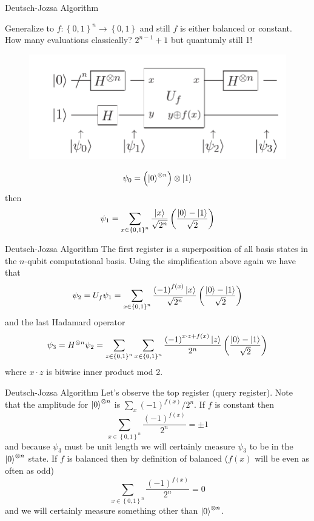 \documentclass{beamer}
\begin{document}
\begin{frame}{Deutsch-Jozsa Algorithm}

Generalize to $f:\left\{ 0,1\right\} ^{n}\to\left\{ 0,1\right\} $ and still $f$ is either balanced or constant.
How many evaluations classically? $2^{n-1}+1$ but quantumly still 1!
 
\begin{figure}[ht]
  \includegraphics[scale=0.33]{pasted2}
\end{figure}

\[
\psi_{0}=\left(\Ket{0}^{\otimes n}\right)\otimes\Ket{1}
\]
 then 
\[
\psi_{1}=\sum_{x\in\left\{ 0,1\right\} ^{n}}\frac{\Ket{x}}{\sqrt{2^{n}}}\left(\frac{\Ket{0}-\Ket{1}}{\sqrt{2}}\right)
\]

\end{frame}

\begin{frame}{Deutsch-Jozsa Algorithm}
The first register is a superposition of all basis states in the $n$-qubit
computational basis. Using the simplification above again we have
that 
\[
\psi_{2}=U_{f}\psi_{1}=\sum_{x\in\left\{ 0,1\right\} ^{n}}\frac{\left(-1\right)^{f\left(x\right)}\Ket{x}}{\sqrt{2^{n}}}\left(\frac{\Ket{0}-\Ket{1}}{\sqrt{2}}\right)
\]
and the last Hadamard operator 
\[
\psi_{3}=H^{\otimes n}\psi_{2}=\sum_{z\in\left\{ 0,1\right\} ^{n}}\sum_{x\in\left\{ 0,1\right\} ^{n}}\frac{\left(-1\right)^{x\cdot z+f\left(x\right)}\Ket{z}}{2^{n}}\left(\frac{\Ket{0}-\Ket{1}}{\sqrt{2}}\right)
\]
where $x\cdot z$ is bitwise inner product mod 2.  
\end{frame}

\begin{frame}{Deutsch-Jozsa Algorithm}
Let's observe the
top register (query register). Note that the amplitude for $\Ket{0}^{\otimes n}$
is $\sum_{x}\left(-1\right)^{f\left(x\right)}/2^{n}$. If $f$ is
constant then
\[
\sum_{x\in\left\{ 0,1\right\} ^{n}}\frac{\left(-1\right)^{f\left(x\right)}}{2^{n}}=\pm1
\]
and because $\psi_{3}$ must be unit length we will certainly measure
$\psi_{3}$ to be in the $\Ket{0}^{\otimes n}$ state. If $f$ is
balanced then by definition of balanced ($f\left(x\right)$ will be
even as often as odd) 
\[
\sum_{x\in\left\{ 0,1\right\} ^{n}}\frac{\left(-1\right)^{f\left(x\right)}}{2^{n}}=0
\]
and we will certainly measure something other than $\Ket{0}^{\otimes n}$.
\end{frame}
\end{document}

